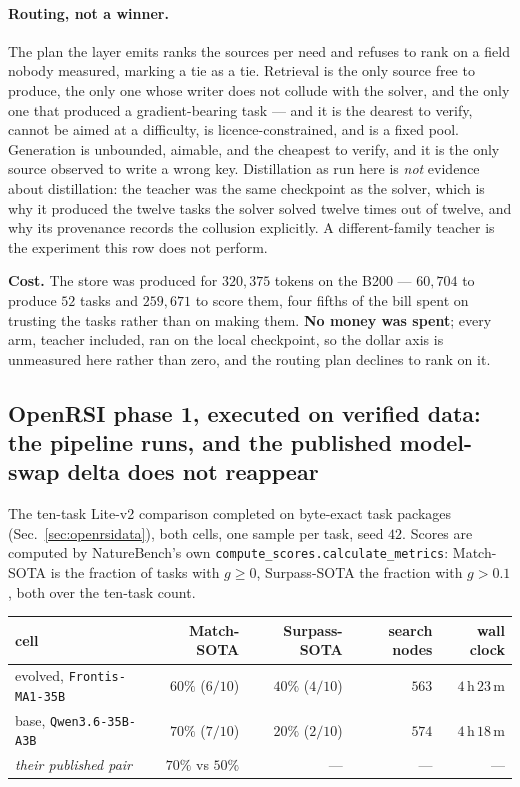 \paragraph{Routing, not a winner.} The plan the layer emits ranks the sources per need and
refuses to rank on a field nobody measured, marking a tie as a tie. Retrieval is the only
source free to produce, the only one whose writer does not collude with the solver, and the
only one that produced a gradient-bearing task --- and it is the dearest to verify, cannot be
aimed at a difficulty, is licence-constrained, and is a fixed pool. Generation is unbounded,
aimable, and the cheapest to verify, and it is the only source observed to write a wrong key.
Distillation as run here is \emph{not} evidence about distillation: the teacher was the same
checkpoint as the solver, which is why it produced the twelve tasks the solver solved twelve
times out of twelve, and why its provenance records the collusion explicitly. A different-family
teacher is the experiment this row does not perform.

\textbf{Cost.} The store was produced for $320{,}375$ tokens on the B200 --- $60{,}704$ to
produce $52$ tasks and $259{,}671$ to score them, four fifths of the bill spent on trusting the
tasks rather than on making them. \textbf{No money was spent}; every arm, teacher included, ran
on the local checkpoint, so the dollar axis is unmeasured here rather than zero, and the routing
plan declines to rank on it.

\subsection{OpenRSI phase 1, executed on verified data: the pipeline runs, and the published
model-swap delta does not reappear}
\label{sec:openrsiphase1}

The ten-task Lite-v2 comparison completed on byte-exact task packages
(Sec.~\ref{sec:openrsidata}), both cells, one sample per task, seed $42$. Scores are computed
by NatureBench's own \texttt{compute\_scores.calculate\_metrics}: Match-SOTA is the fraction
of tasks with $g \ge 0$, Surpass-SOTA the fraction with $g > 0.1$, both over the ten-task
count.

\begin{center}
\begin{tabular}{lrrrr}
\toprule
cell & Match-SOTA & Surpass-SOTA & search nodes & wall clock \\
\midrule
evolved, \texttt{Frontis-MA1-35B}   & $60\%$ ($6/10$) & $40\%$ ($4/10$) & $563$ & $4$\,h\,$23$\,m \\
base, \texttt{Qwen3.6-35B-A3B}      & $70\%$ ($7/10$) & $20\%$ ($2/10$) & $574$ & $4$\,h\,$18$\,m \\
\midrule
\emph{their published pair}         & $70\%$ vs $50\%$ & --- & --- & --- \\
\bottomrule
\end{tabular}
\end{center}

